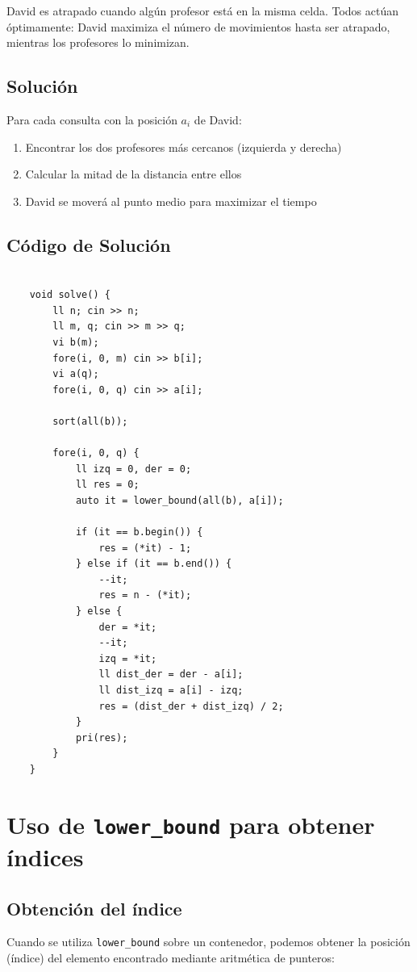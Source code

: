 David es atrapado cuando algún profesor está en la misma celda. Todos actúan óptimamente: David maximiza el número de movimientos hasta ser atrapado, mientras los profesores lo minimizan.

\subsection{Solución}
Para cada consulta con la posición $a_i$ de David:
\begin{enumerate}
	\item Encontrar los dos profesores más cercanos (izquierda y derecha)
	\item Calcular la mitad de la distancia entre ellos
	\item David se moverá al punto medio para maximizar el tiempo
\end{enumerate}

\subsection{Código de Solución}
\begin{lstlisting}[style=cppstyle, caption={Solución del problema}]

	void solve() {
		ll n; cin >> n;
		ll m, q; cin >> m >> q;
		vi b(m);
		fore(i, 0, m) cin >> b[i];
		vi a(q);
		fore(i, 0, q) cin >> a[i];
		
		sort(all(b));
		
		fore(i, 0, q) {
			ll izq = 0, der = 0;
			ll res = 0;
			auto it = lower_bound(all(b), a[i]);
			
			if (it == b.begin()) {
				res = (*it) - 1;
			} else if (it == b.end()) {
				--it;
				res = n - (*it);
			} else {
				der = *it;
				--it;
				izq = *it;
				ll dist_der = der - a[i];
				ll dist_izq = a[i] - izq;
				res = (dist_der + dist_izq) / 2;
			}
			pri(res);
		}
	}
\end{lstlisting}

\section{Uso de \texttt{lower\_bound} para obtener índices}

\subsection{Obtención del índice}
Cuando se utiliza \texttt{lower\_bound} sobre un contenedor, podemos obtener la posición (índice) del elemento encontrado mediante aritmética de punteros:

